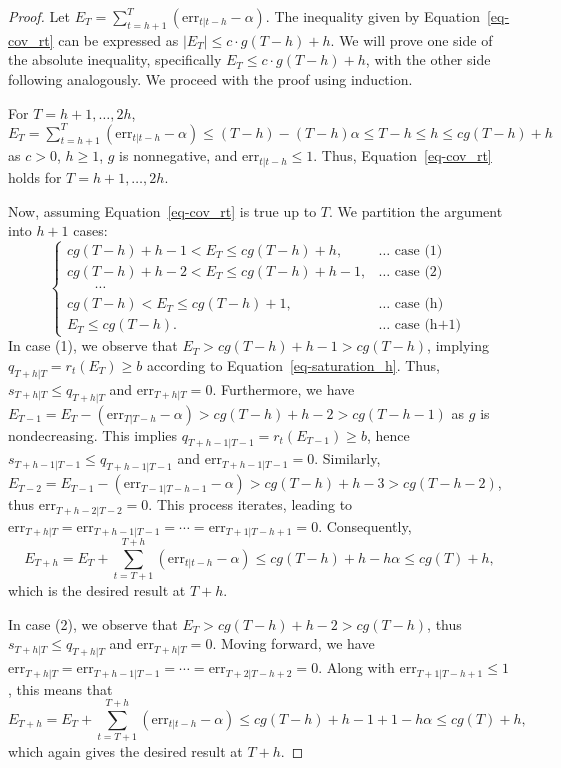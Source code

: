\documentclass[
  11pt,
  a4paper,
]{article}
\theoremstyle{plain}
\theoremstyle{remark}
\begin{document}
\begin{proof}
Let \(E_T=\sum_{t=h+1}^{T}\left(\mathrm{err}_{t|t-h}-\alpha\right)\).
The inequality given by Equation~\ref{eq-cov_rt} can be expressed as
\(\left|E_T\right| \leq c \cdot g(T-h) + h\). We will prove one side of
the absolute inequality, specifically \(E_T \leq c \cdot g(T-h) + h\),
with the other side following analogously. We proceed with the proof
using induction.

For \(T=h+1,\ldots,2h\),
\(E_T = \sum_{t=h+1}^{T}(\mathrm{err}_{t|t-h}-\alpha) \leq (T-h)-(T-h)\alpha \leq T-h \leq h \leq cg(T-h) + h\)
as \(c>0\), \(h\geq 1\), \(g\) is nonnegative, and
\(\mathrm{err}_{t|t-h} \leq 1\). Thus, Equation~\ref{eq-cov_rt} holds
for \(T=h+1,\ldots,2h\).

Now, assuming Equation~\ref{eq-cov_rt} is true up to \(T\). We partition
the argument into \(h+1\) cases: \[
\begin{cases}
cg(T-h)+h-1 < E_T \leq cg(T-h)+h, & \ldots \text { case (1) } \\
cg(T-h)+h-2 < E_T \leq cg(T-h)+h-1, & \ldots \text { case (2) } \\
\qquad \cdots \\
cg(T-h) < E_T \leq cg(T-h)+1, & \ldots \text { case (h) } \\
E_T \leq cg(T-h). & \ldots \text { case (h+1) }
\end{cases}
\] In case (1), we observe that \(E_T > cg(T-h)+h-1 > cg(T-h)\),
implying \(q_{T+h|T} = r_t(E_{T}) \geq b\) according to
Equation~\ref{eq-saturation_h}. Thus, \(s_{T+h|T} \leq q_{T+h|T}\) and
\(\mathrm{err}_{T+h|T} = 0\). Furthermore, we have
\(E_{T-1} = E_T - (\mathrm{err}_{T|T-h} - \alpha) > cg(T-h)+h-2 > cg(T-h-1)\)
as \(g\) is nondecreasing. This implies
\(q_{T+h-1|T-1} = r_t(E_{T-1}) \geq b\), hence
\(s_{T+h-1|T-1} \leq q_{T+h-1|T-1}\) and
\(\mathrm{err}_{T+h-1|T-1} = 0\). Similarly,
\(E_{T-2} = E_{T-1} - (\mathrm{err}_{T-1|T-h-1} - \alpha) > cg(T-h)+h-3 > cg(T-h-2)\),
thus \(\mathrm{err}_{T+h-2|T-2} = 0\). This process iterates, leading to
\(\mathrm{err}_{T+h|T} = \mathrm{err}_{T+h-1|T-1} = \cdots = \mathrm{err}_{T+1|T-h+1} = 0\).
Consequently, \[
E_{T+h} = E_T+\sum_{t=T+1}^{T+h}(\mathrm{err}_{t|t-h}-\alpha) \leq cg(T-h)+h-h\alpha \leq cg(T)+h,
\] which is the desired result at \(T+h\).

In case (2), we observe that \(E_T > cg(T-h)+h-2 > cg(T-h)\), thus
\(s_{T+h|T} \leq q_{T+h|T}\) and \(\mathrm{err}_{T+h|T} = 0\). Moving
forward, we have
\(\mathrm{err}_{T+h|T} = \mathrm{err}_{T+h-1|T-1} = \cdots = \mathrm{err}_{T+2|T-h+2} = 0\).
Along with \(\mathrm{err}_{T+1|T-h+1} \leq 1\), this means that \[
E_{T+h} = E_T+\sum_{t=T+1}^{T+h}(\mathrm{err}_{t|t-h}-\alpha) \leq cg(T-h)+h-1+1-h\alpha \leq cg(T)+h,
\] which again gives the desired result at \(T+h\).


\end{proof}
\end{document}
